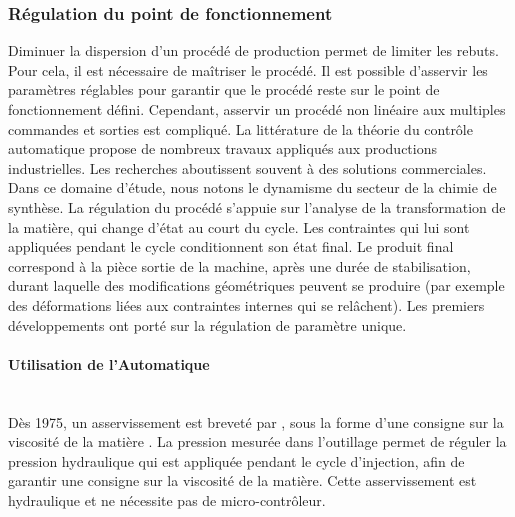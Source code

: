 \subsubsection{Régulation du point de fonctionnement}
Diminuer la dispersion d’un procédé de production permet de limiter les rebuts.
Pour cela, il est nécessaire de maîtriser le procédé.
Il est possible d’asservir les paramètres réglables pour garantir que le procédé reste sur le point de fonctionnement défini.
Cependant, asservir un procédé non linéaire aux multiples commandes et sorties est compliqué.
La littérature de la théorie du contrôle automatique propose de nombreux travaux appliqués aux productions industrielles.
Les recherches aboutissent souvent à des solutions commerciales.
Dans ce domaine d'étude, nous notons le dynamisme du secteur de la chimie de synthèse.
La régulation du procédé s'appuie sur l'analyse de la transformation de la matière, qui change d'état au court du cycle.
Les contraintes qui lui sont appliquées pendant le cycle conditionnent son état final.
Le produit final correspond à la pièce sortie de la machine, après une durée de stabilisation, durant laquelle des modifications géométriques peuvent se produire (par exemple des déformations liées aux contraintes internes qui se relâchent).
Les premiers développements ont porté sur la régulation de paramètre unique.

\paragraph{Utilisation de l'Automatique}\mbox{} \\
Dès 1975, un asservissement est breveté par \citeauthor{laczko_controller_1975}, sous la forme d'une consigne sur la viscosité de la matière \cite{laczko_controller_1975}.
La pression mesurée dans l'outillage permet de réguler la pression hydraulique qui est appliquée pendant le cycle d'injection, afin de garantir une consigne sur la viscosité de la matière.
Cette asservissement est hydraulique et ne nécessite pas de micro-contrôleur.

